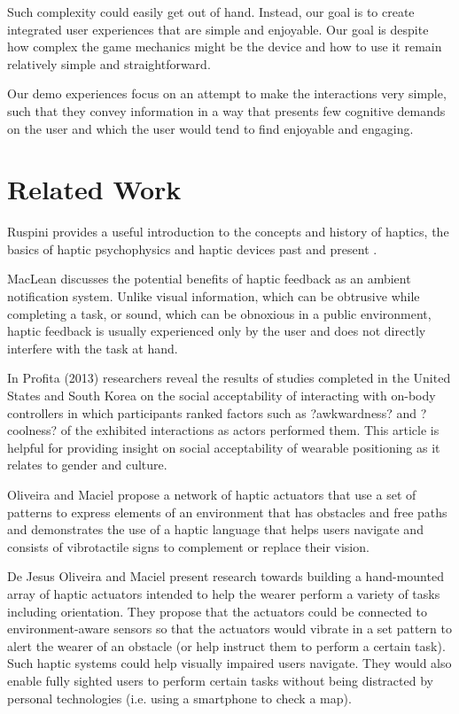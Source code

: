\documentclass{chi-ext}
\begin{document}
Such complexity could easily get out of hand. Instead, our goal is to create integrated user experiences that are simple and enjoyable. Our goal is despite how complex the game mechanics might be the device and how to use it remain relatively simple and straightforward.

Our demo experiences focus on an attempt to make the interactions very simple, such that they convey information in a way that presents few cognitive demands on the user and which the user would tend to find enjoyable and engaging.

\section{Related Work}

Ruspini provides a useful introduction to the concepts and history of haptics, the basics of haptic psychophysics and haptic devices past and present \cite{ruspini1999haptics}.

MacLean \cite{maclean2009putting} discusses the potential benefits of haptic feedback as an ambient notification system. Unlike visual information, which can be obtrusive while completing a task, or sound, which can be obnoxious in a public environment, haptic feedback is usually experienced only by the user and does not directly interfere with the task at hand. 

In Profita (2013) \cite{profita2013don} researchers reveal the results of studies completed in the United States and South Korea on the social acceptability of interacting with on-body controllers in which participants  ranked factors such as ?awkwardness? and ?coolness? of the exhibited interactions as actors performed them. This article is helpful for providing insight on social acceptability of wearable positioning as it relates to gender and culture.

Oliveira and Maciel propose a network of haptic actuators that use a set of patterns to express elements of an environment that has obstacles and free paths and demonstrates the use of a haptic language that helps users navigate and consists of vibrotactile signs to complement or replace their vision. \cite{Jesus-Oliveira:2013aa}

De Jesus Oliveira and Maciel \cite{Jesus-Oliveira:2013aa} present research towards building a hand-mounted array of haptic actuators intended to help the wearer perform a variety of tasks including orientation. They propose that the actuators could be connected to environment-aware sensors so that the actuators would vibrate in a set pattern to alert the wearer of an obstacle (or help instruct them to perform a certain task). Such haptic systems could help visually impaired users navigate. They would also enable fully sighted users to perform certain tasks without being distracted by personal technologies (i.e. using a smartphone to check a map).
\end{document}
